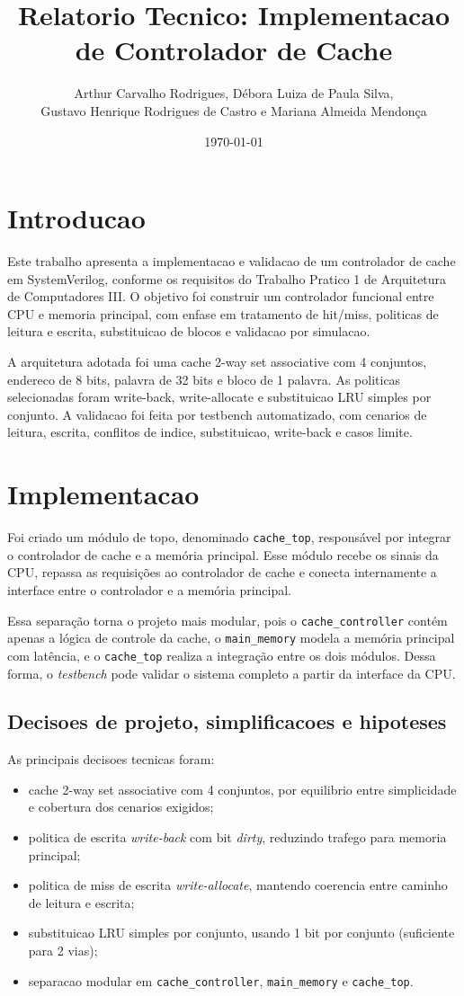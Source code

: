 ﻿\documentclass[12pt,a4paper]{article}
\title{Relatorio Tecnico: Implementacao de Controlador de Cache}
\author{Arthur Carvalho Rodrigues, Débora Luiza de Paula Silva, \\ Gustavo Henrique Rodrigues de Castro e Mariana Almeida Mendonça}
\date{\today}
\begin{document}
\maketitle

\section{Introducao}
Este trabalho apresenta a implementacao e validacao de um controlador de cache em SystemVerilog, conforme os requisitos do Trabalho Pratico 1 de Arquitetura de Computadores III. O objetivo foi construir um controlador funcional entre CPU e memoria principal, com enfase em tratamento de hit/miss, politicas de leitura e escrita, substituicao de blocos e validacao por simulacao.

A arquitetura adotada foi uma cache 2-way set associative com 4 conjuntos, endereco de 8 bits, palavra de 32 bits e bloco de 1 palavra. As politicas selecionadas foram write-back, write-allocate e substituicao LRU simples por conjunto. A validacao foi feita por testbench automatizado, com cenarios de leitura, escrita, conflitos de indice, substituicao, write-back e casos limite.

\section{Implementacao}
Foi criado um módulo de topo, denominado \texttt{cache\_top}, responsável por integrar o controlador de cache e a memória principal. Esse módulo recebe os sinais da CPU, repassa as requisições ao controlador de cache e conecta internamente a interface entre o controlador e a memória principal.

Essa separação torna o projeto mais modular, pois o \texttt{cache\_controller} contém apenas a lógica de controle da cache, o \texttt{main\_memory} modela a memória principal com latência, e o \texttt{cache\_top} realiza a integração entre os dois módulos. Dessa forma, o \textit{testbench} pode validar o sistema completo a partir da interface da CPU.




\subsection{Decisoes de projeto, simplificacoes e hipoteses}
As principais decisoes tecnicas foram:
\begin{itemize}
    \item cache 2-way set associative com 4 conjuntos, por equilibrio entre simplicidade e cobertura dos cenarios exigidos;
    \item politica de escrita \textit{write-back} com bit \textit{dirty}, reduzindo trafego para memoria principal;
    \item politica de miss de escrita \textit{write-allocate}, mantendo coerencia entre caminho de leitura e escrita;
    \item substituicao LRU simples por conjunto, usando 1 bit por conjunto (suficiente para 2 vias);
    \item separacao modular em \texttt{cache\_controller}, \texttt{main\_memory} e \texttt{cache\_top}.
\end{itemize}
\end{document}
